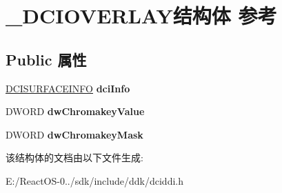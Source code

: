 \hypertarget{struct___d_c_i_o_v_e_r_l_a_y}{}\section{\+\_\+\+D\+C\+I\+O\+V\+E\+R\+L\+A\+Y结构体 参考}
\label{struct___d_c_i_o_v_e_r_l_a_y}
\subsection*{Public 属性}
\begin{DoxyCompactItemize}
\item 
\mbox{\label{struct___d_c_i_o_v_e_r_l_a_y_a636eb55669911097b1458f7c02895ba2}} 
\hyperlink{struct___d_c_i_s_u_r_f_a_c_e_i_n_f_o}{D\+C\+I\+S\+U\+R\+F\+A\+C\+E\+I\+N\+FO} {\bfseries dci\+Info}
\item 
\mbox{\label{struct___d_c_i_o_v_e_r_l_a_y_a8008d21f06ef694b0598134cf1d6a577}} 
D\+W\+O\+RD {\bfseries dw\+Chromakey\+Value}
\item 
\mbox{\label{struct___d_c_i_o_v_e_r_l_a_y_ad1335255ec1b897c71a00c0d95fe3729}} 
D\+W\+O\+RD {\bfseries dw\+Chromakey\+Mask}
\end{DoxyCompactItemize}


该结构体的文档由以下文件生成\+:\begin{DoxyCompactItemize}
\item 
E\+:/\+React\+O\+S-\/0../sdk/include/ddk/dciddi.\+h\end{DoxyCompactItemize}

